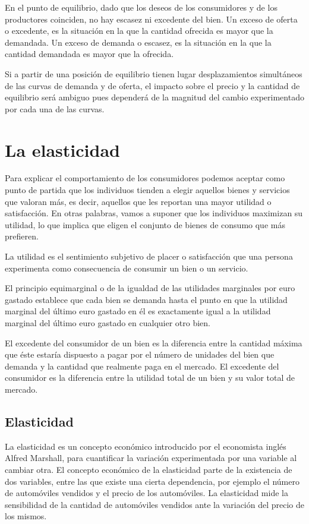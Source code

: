 \documentclass[
]{krantz}
\begin{document}
En el punto de equilibrio, dado que los deseos de los consumidores y de los productores coinciden, no hay escasez ni excedente del bien.
Un exceso de oferta o excedente, es la situación en la que la cantidad ofrecida es mayor que la demandada.
Un exceso de demanda o escasez, es la situación en la que la cantidad demandada es mayor que la ofrecida.

Si a partir de una posición de equilibrio tienen lugar desplazamientos simultáneos de las curvas de demanda y de oferta, el impacto sobre el precio y la cantidad de equilibrio será ambiguo pues dependerá de la magnitud del cambio experimentado por cada una de las curvas.

\hypertarget{la-elasticidad}{%
\chapter{La elasticidad}\label{la-elasticidad}}

Para explicar el comportamiento de los consumidores podemos aceptar como punto de partida que los individuos tienden a elegir aquellos bienes y servicios que valoran más, es decir, aquellos que les reportan una mayor utilidad o satisfacción. En otras palabras, vamos a suponer que los individuos maximizan su utilidad, lo que implica que eligen el conjunto de bienes de consumo que más prefieren.

La utilidad es el sentimiento subjetivo de placer o satisfacción que una persona experimenta como consecuencia de consumir un bien o un servicio.

El principio equimarginal o de la igualdad de las utilidades marginales por euro gastado establece que cada bien se demanda hasta el punto en que la utilidad marginal del último euro gastado en él es exactamente igual a la utilidad marginal del último euro gastado en cualquier otro bien.

El excedente del consumidor de un bien es la diferencia entre la cantidad máxima que éste estaría dispuesto a pagar por el número de unidades del bien que demanda y la cantidad que realmente paga en el mercado. El excedente del consumidor es la diferencia entre la utilidad total de un bien y su valor total de mercado.

\hypertarget{elasticidad}{%
\section{Elasticidad}\label{elasticidad}}

La elasticidad es un concepto económico introducido por el economista inglés Alfred Marshall, para cuantificar la variación experimentada por una variable al cambiar otra. El concepto económico de la elasticidad parte de la existencia de dos variables, entre las que existe una cierta dependencia, por ejemplo el número de automóviles vendidos y el precio de los automóviles. La elasticidad mide la sensibilidad de la cantidad de automóviles vendidos ante la variación del precio de los mismos.
\end{document}
